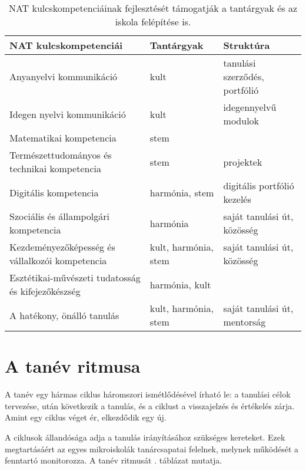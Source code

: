 \begin{table}
  \centering
      \begin{tabular}{p{5cm}|>{\raggedright}p{3cm}|p{3cm}}


        \textbf{NAT kulcskompetenciái} & \textbf{Tantárgyak} & \textbf{Struktúra}\\ \hline
Anyanyelvi kommunikáció & kult & tanulási szerződés, portfólió\\ \hline
Idegen nyelvi kommunikáció & kult & idegennyelvű modulok\\ \hline
Matematikai kompetencia & stem & \\ \hline
Természettudományos és technikai kompetencia & stem & projektek \\ \hline
Digitális kompetencia & harmónia, stem & digitális portfólió kezelés\\ \hline
Szociális és állampolgári kompetencia & harmónia & saját tanulási út, közösség\\ \hline
Kezdeményezőképesség és vállalkozói kompetencia & kult, harmónia, stem & saját tanulási út, közösség\\ \hline
Esztétikai-művészeti tudatosság és kifejezőkészség & harmónia, kult & \\ \hline
A hatékony, önálló tanulás & kult, harmónia, stem & saját tanulási út, mentorság\\

      \end{tabular}
      \caption{NAT kulcskompetenciáinak fejlesztését támogatják a tantárgyak és az iskola felépítése is.}
      \label{tbl:nat_kulcs}
    \end{table}

\section{A tanév ritmusa}

A tanév egy hármas ciklus háromszori ismétlődésével írható le: a tanulási célok tervezése, után következik a tanulás, és a ciklust a visszajelzés és értékelés zárja.  Amint egy ciklus véget ér, elkezdődik egy új.

A ciklusok állandósága adja a tanulás irányításához szükséges kereteket. Ezek megtartásáért az egyes mikroiskolák tanárcsapatai felelnek, melynek működését a fenntartó monitorozza. A tanév ritmusát . táblázat mutatja.




